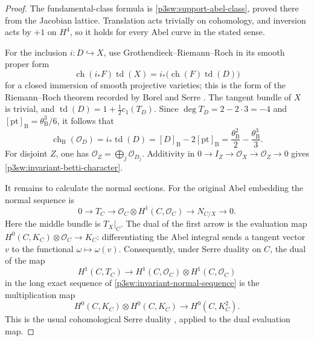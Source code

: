 \documentclass[11pt]{article}
\numberwithin{equation}{section}
\begin{document}
\begin{proof}
The fundamental-class formula is
\eqref{p3sw:support-abel-class}, proved there from the Jacobian lattice.
Translation acts trivially on cohomology, and inversion acts by \(+1\)
on \(H^4\), so it holds for every Abel curve in the stated sense.

For the inclusion \(i:D\hookrightarrow X\), use
Grothendieck--Riemann--Roch in its smooth proper form
\[
 \operatorname{ch}(i_*F)\operatorname{td}(X)
   =i_*\bigl(\operatorname{ch}(F)\operatorname{td}(D)\bigr)
\]
for a closed immersion of smooth projective varieties; this is the
form of the Riemann--Roch theorem recorded by Borel and Serre
\cite{p3swBorelSerreRR}.  The tangent bundle of \(X\) is trivial, and
\(\operatorname{td}(D)=1+\tfrac12c_1(T_D)\).  Since
\(\deg T_D=2-2\cdot3=-4\) and
\([\mathrm{pt}]_{\mathrm B}=\theta_{\mathrm B}^3/6\), it follows that
\[
 \operatorname{ch}_{\mathrm B}(\mathcal O_D)
 =i_*\operatorname{td}(D)
 =[D]_{\mathrm B}-2[\mathrm{pt}]_{\mathrm B}
 =\frac{\theta_{\mathrm B}^2}{2}
     -\frac{\theta_{\mathrm B}^3}{3}.
\]
For disjoint \(Z\), one has
\(\mathcal O_Z=\bigoplus_j\mathcal O_{D_j}\).  Additivity in
\(0\to I_Z\to\mathcal O_X\to\mathcal O_Z\to0\) gives
\eqref{p3sw:invariant-betti-character}.

It remains to calculate the normal sections.  For the original Abel
embedding the normal sequence is
\begin{equation}\label{p3sw:invariant-normal-sequence}
 0\longrightarrow T_C\longrightarrow
 \mathcal O_C\otimes H^1(C,\mathcal O_C)
 \longrightarrow N_{C/X}\longrightarrow0.
\end{equation}
Here the middle bundle is \(T_X|_C\).  The dual of the first arrow is
the evaluation map \(H^0(C,K_C)\otimes\mathcal O_C\to K_C\):
differentiating the Abel integral sends a tangent vector \(v\) to
the functional \(\omega\mapsto\omega(v)\).
Consequently, under Serre duality on \(C\), the dual of the map
\[
 H^1(C,T_C)\longrightarrow
 H^1(C,\mathcal O_C)\otimes H^1(C,\mathcal O_C)
\]
in the long exact sequence of
\eqref{p3sw:invariant-normal-sequence} is the multiplication map
\[
 H^0(C,K_C)\otimes H^0(C,K_C)\longrightarrow H^0(C,K_C^2).
\]
This is the usual cohomological Serre duality
\cite{p3swSerreDuality}, applied to the dual evaluation map.


\end{proof}
\end{document}
